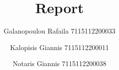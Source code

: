 %
\begin{titlepage}
  \title{Report}
  \author{
  Galanopoulou Rafaila 7115112200033 
  \and
  Kalopisis Giannis 7115112200011
  \and
  Notaris Giannis 7115112200038}
  \maketitle
\end{titlepage}
\clearpage
